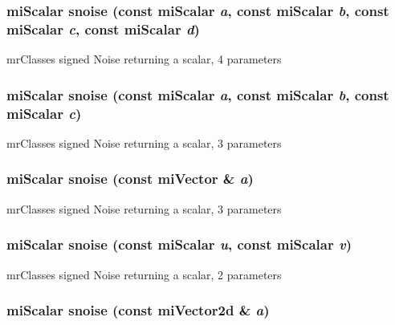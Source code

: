 \subsubsection{\setlength{\rightskip}{0pt plus 5cm}mi\-Scalar snoise (const mi\-Scalar {\em a}, const mi\-Scalar {\em b}, const mi\-Scalar {\em c}, const mi\-Scalar {\em d})\hspace{0.3cm}{\tt  [inline]}}\label{namespacersl_a61}


mr\-Classes signed Noise returning a scalar, 4 parameters 

\subsubsection{\setlength{\rightskip}{0pt plus 5cm}mi\-Scalar snoise (const mi\-Scalar {\em a}, const mi\-Scalar {\em b}, const mi\-Scalar {\em c})\hspace{0.3cm}{\tt  [inline]}}\label{namespacersl_a60}


mr\-Classes signed Noise returning a scalar, 3 parameters 

\subsubsection{\setlength{\rightskip}{0pt plus 5cm}mi\-Scalar snoise (const mi\-Vector \& {\em a})\hspace{0.3cm}{\tt  [inline]}}\label{namespacersl_a59}


mr\-Classes signed Noise returning a scalar, 3 parameters 

\subsubsection{\setlength{\rightskip}{0pt plus 5cm}mi\-Scalar snoise (const mi\-Scalar {\em u}, const mi\-Scalar {\em v})\hspace{0.3cm}{\tt  [inline]}}\label{namespacersl_a58}


mr\-Classes signed Noise returning a scalar, 2 parameters 

\subsubsection{\setlength{\rightskip}{0pt plus 5cm}mi\-Scalar snoise (const mi\-Vector2d \& {\em a})\hspace{0.3cm}{\tt  [inline]}}\label{namespacersl_a57}


